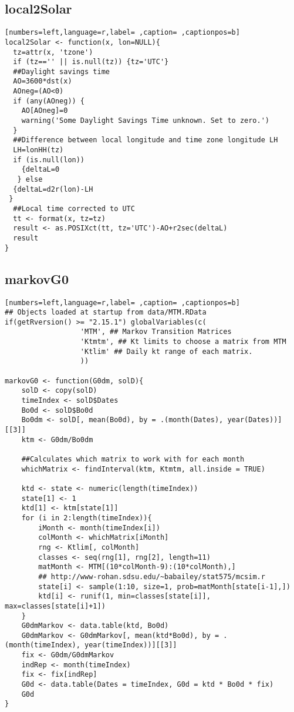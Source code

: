 \subsection{local2Solar}
\label{sec:org556f3f6}
\begin{lstlisting}[numbers=left,language=r,label= ,caption= ,captionpos=b]
local2Solar <- function(x, lon=NULL){	
  tz=attr(x, 'tzone')
  if (tz=='' || is.null(tz)) {tz='UTC'}
  ##Daylight savings time
  AO=3600*dst(x)
  AOneg=(AO<0)
  if (any(AOneg)) {
    AO[AOneg]=0
    warning('Some Daylight Savings Time unknown. Set to zero.')
  }
  ##Difference between local longitude and time zone longitude LH
  LH=lonHH(tz)
  if (is.null(lon)) 
    {deltaL=0
   } else
  {deltaL=d2r(lon)-LH
 }
  ##Local time corrected to UTC
  tt <- format(x, tz=tz)
  result <- as.POSIXct(tt, tz='UTC')-AO+r2sec(deltaL)
  result
}
\end{lstlisting}
\subsection{markovG0}
\label{sec:org52f7498}
\begin{lstlisting}[numbers=left,language=r,label= ,caption= ,captionpos=b]
## Objects loaded at startup from data/MTM.RData
if(getRversion() >= "2.15.1") globalVariables(c(
                  'MTM', ## Markov Transition Matrices
                  'Ktmtm', ## Kt limits to choose a matrix from MTM
                  'Ktlim' ## Daily kt range of each matrix.
                  ))

markovG0 <- function(G0dm, solD){
    solD <- copy(solD)
    timeIndex <- solD$Dates
    Bo0d <- solD$Bo0d
    Bo0dm <- solD[, mean(Bo0d), by = .(month(Dates), year(Dates))][[3]]
    ktm <- G0dm/Bo0dm

    ##Calculates which matrix to work with for each month
    whichMatrix <- findInterval(ktm, Ktmtm, all.inside = TRUE)

    ktd <- state <- numeric(length(timeIndex))
    state[1] <- 1
    ktd[1] <- ktm[state[1]]
    for (i in 2:length(timeIndex)){
        iMonth <- month(timeIndex[i])
        colMonth <- whichMatrix[iMonth]
        rng <- Ktlim[, colMonth]
        classes <- seq(rng[1], rng[2], length=11)
        matMonth <- MTM[(10*colMonth-9):(10*colMonth),]
        ## http://www-rohan.sdsu.edu/~babailey/stat575/mcsim.r
        state[i] <- sample(1:10, size=1, prob=matMonth[state[i-1],])
        ktd[i] <- runif(1, min=classes[state[i]], max=classes[state[i]+1])
    }
    G0dmMarkov <- data.table(ktd, Bo0d)
    G0dmMarkov <- G0dmMarkov[, mean(ktd*Bo0d), by = .(month(timeIndex), year(timeIndex))][[3]]
    fix <- G0dm/G0dmMarkov
    indRep <- month(timeIndex)
    fix <- fix[indRep]
    G0d <- data.table(Dates = timeIndex, G0d = ktd * Bo0d * fix)
    G0d
}
\end{lstlisting}
